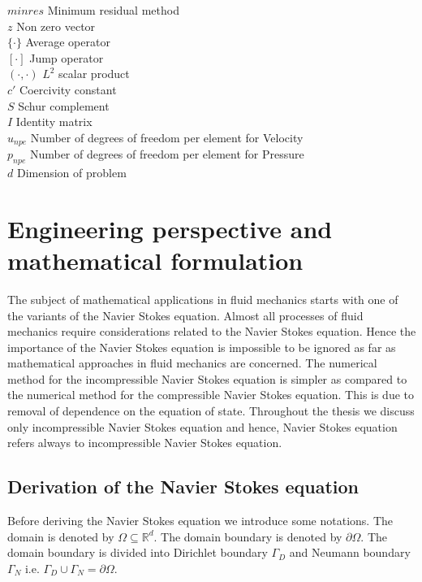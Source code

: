 \documentclass[a4paper,12pt]{book}
\begin{document}
$minres$ Minimum residual method\\
$z$ Non zero vector\\
$\lbrace \cdot \rbrace$ Average operator\\
$[\cdot]$ Jump operator\\
$(\cdot,\cdot)$ $L^2$ scalar product\\
$c'$ Coercivity constant\\
$S$ Schur complement\\
$I$ Identity matrix\\
$u_{npe}$ Number of degrees of freedom per element for Velocity\\
$p_{npe}$ Number of degrees of freedom per element for Pressure\\
$d$ Dimension of problem\\

\chapter[Perspective and Formulation]{Engineering perspective and mathematical formulation} 

The subject of mathematical applications in fluid mechanics starts with  one of the variants of the Navier Stokes equation. Almost all processes of fluid mechanics require considerations related to the Navier Stokes equation. Hence the importance of the Navier Stokes equation is impossible to be ignored as far as mathematical approaches in fluid mechanics are concerned. The numerical method for the incompressible Navier Stokes equation is simpler as compared to the numerical method for the compressible Navier Stokes equation. This is due to removal of dependence on the equation of state. Throughout the thesis we discuss only incompressible Navier Stokes equation and hence, Navier Stokes equation refers always to incompressible Navier Stokes equation.

\section[Derivation]{Derivation of the Navier Stokes equation}

Before deriving the Navier Stokes equation we introduce some notations. The domain is denoted by $\Omega \subseteq \mathbb{R}^d $. The domain boundary is denoted by $\partial \Omega$. The domain boundary is divided into Dirichlet boundary $\Gamma_D$ and Neumann boundary $\Gamma_N$ i.e. $\Gamma_D \cup \Gamma_N = \partial \Omega $. 
\end{document}
